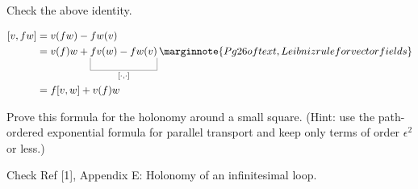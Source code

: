 \documentclass[10pt]{article}
\begin{document}
\begin{example}
	Check the above identity.
\end{example}
\sol $$
\begin{aligned}
	[v,fw]&=v(fw)-fw(v)\\
	&=v(f)w+\ub{fv(w)-fw(v)}{[\cdot,\cdot]}\marginnote{Pg 26 of text, Leibniz rule for vector fields}\\
	&=f[v,w]+v(f)w
\end{aligned}
$$


\begin{example}\label{b2e95}
	Prove this formula for the holonomy around a small square. (Hint: use the path-ordered exponential formula for parallel transport and keep only terms of order $\epsilon^2$ or less.)
\end{example}
\sol Check Ref [1], Appendix E: Holonomy of an infinitesimal loop.
\end{document}
